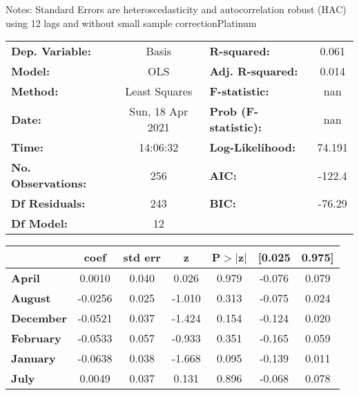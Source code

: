 Notes: \newline
 [1] Standard Errors are heteroscedasticity and autocorrelation robust (HAC) using 12 lags and without small sample correctionPlatinum\begin{center}
\begin{tabular}{lclc}
\toprule
\textbf{Dep. Variable:}    &      Basis       & \textbf{  R-squared:         } &     0.061   \\
\textbf{Model:}            &       OLS        & \textbf{  Adj. R-squared:    } &     0.014   \\
\textbf{Method:}           &  Least Squares   & \textbf{  F-statistic:       } &       nan   \\
\textbf{Date:}             & Sun, 18 Apr 2021 & \textbf{  Prob (F-statistic):} &      nan    \\
\textbf{Time:}             &     14:06:32     & \textbf{  Log-Likelihood:    } &    74.191   \\
\textbf{No. Observations:} &         256      & \textbf{  AIC:               } &    -122.4   \\
\textbf{Df Residuals:}     &         243      & \textbf{  BIC:               } &    -76.29   \\
\textbf{Df Model:}         &          12      & \textbf{                     } &             \\
\bottomrule
\end{tabular}
\begin{tabular}{lcccccc}
                   & \textbf{coef} & \textbf{std err} & \textbf{z} & \textbf{P$> |$z$|$} & \textbf{[0.025} & \textbf{0.975]}  \\
\midrule
\textbf{April}     &       0.0010  &        0.040     &     0.026  &         0.979        &       -0.076    &        0.079     \\
\textbf{August}    &      -0.0256  &        0.025     &    -1.010  &         0.313        &       -0.075    &        0.024     \\
\textbf{December}  &      -0.0521  &        0.037     &    -1.424  &         0.154        &       -0.124    &        0.020     \\
\textbf{February}  &      -0.0533  &        0.057     &    -0.933  &         0.351        &       -0.165    &        0.059     \\
\textbf{January}   &      -0.0638  &        0.038     &    -1.668  &         0.095        &       -0.139    &        0.011     \\
\textbf{July}      &       0.0049  &        0.037     &     0.131  &         0.896        &       -0.068    &        0.078     \\

\end{tabular}
\end{center}
